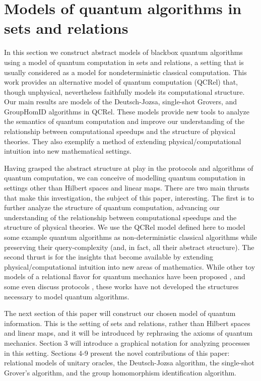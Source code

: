\section{\color{blue} Models of quantum algorithms in sets and relations}
\label{sec:qalgrel}

In this section we construct abstract models of blackbox quantum algorithms using a model of quantum computation in sets and relations, a setting that is usually considered as a model for nondeterministic classical computation.  This work provides an alternative model of quantum computation (QCRel) that, though unphysical, nevertheless faithfully models its computational structure.  Our main results are models of the Deutsch-Jozsa, single-shot Grovers, and GroupHomID algorithms in QCRel. These models provide new tools to analyze the semantics of quantum computation and improve our understanding of the relationship between computational speedups and the structure of physical theories. They also exemplify a method of extending physical/computational intuition into new mathematical settings.


Having grasped the abstract structure at play in the protocols and algorithms of quantum computation, we can conceive of modelling quantum computation in settings other than Hilbert spaces and linear maps.  There are two main thrusts that make this investigation, the subject of this paper, interesting.  The first is to further analyze the structure of quantum computation, advancing our understanding of the relationship between computational speedups and the structure of physical theories. We use the QCRel model defined here to model some example quantum algorithms as non-deterministic classical algorithms while preserving their query-complexity (and, in fact, all their abstract structure). The second thrust is for the insights that become available by extending physical/computational intuition into new areas of mathematics. While other toy models of a relational flavor for quantum mechanics have been proposed \cite{ellermanModelQM}\cite{discreteQT}\cite{modalQT}\cite{spekk}, and some even discuss protocols \cite{QCFF_James}, these works have not developed the structures necessary to model quantum algorithms.

The next section of this paper will construct our chosen model of quantum information.  This is the setting of sets and relations, rather than Hilbert spaces and linear maps, and it will be introduced by rephrasing the axioms of quantum mechanics. Section 3 will introduce a graphical notation for analyzing processes in this setting. Sections 4-9 present the novel contributions of this paper: relational models of unitary oracles, the Deutsch-Jozsa algorithm, the single-shot Grover's algorithm, and the group homomorphism identification algorithm.


